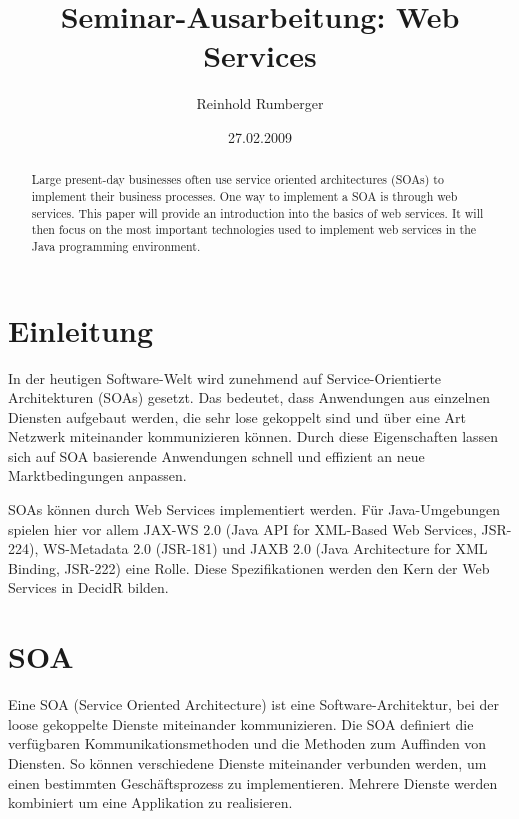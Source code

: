 \documentclass[runningheads]{llncs}
\author{Reinhold Rumberger}
\institute{Institute of Architecture of Application Systems (IAAS),\\
  University of Stuttgart\\
  \email{rumberrd@studi.informatik.uni-stuttgart.de}}
\title{Seminar-Ausarbeitung: Web Services}
\date{27.02.2009}
\newcommand{\germanquote}[1]{\glqq{}#1\grqq{}}
\newcommand{\decidr}{DecidR}
\begin{document}
  \frontmatter
  \pagestyle{headings}

  \maketitle
  \tableofcontents
  \mainmatter

  \nocite{bk_ralph}

  \label{abstract}
  \begin{otherlanguage}{english}
    \begin{abstract}
      Large present-day businesses often use service oriented architectures (SOAs) to implement
      their business processes. One way to implement a SOA is through web services. This paper will
      provide an introduction into the basics of web services. It will then focus on the most
      important technologies used to implement web services in the Java programming environment.
    \end{abstract}
  \end{otherlanguage}


  \label{intro}
  \section{Einleitung}
    In der heutigen Software-Welt wird zunehmend auf Service-Orientierte Architekturen (SOAs)
    gesetzt. Das bedeutet, dass Anwendungen aus einzelnen Diensten aufgebaut werden, die sehr lose
    gekoppelt sind und über eine Art Netzwerk miteinander kommunizieren können. Durch diese
    Eigenschaften lassen sich auf SOA basierende Anwendungen schnell und effizient an neue
    Marktbedingungen anpassen.

    SOAs können durch Web Services implementiert werden. Für Java-Um\-ge\-bung\-en spielen hier vor
    allem JAX-WS 2.0 (Java API for XML-Based Web Services, JSR-224), WS-Metadata 2.0 (JSR-181) und
    JAXB 2.0 (Java Architecture for XML Binding, JSR-222) eine Rolle. Diese Spezifikationen werden
    den Kern der Web Services in \decidr{} bilden.


  \label{soa}
  \section{SOA}
  \nocite{wk_soa}
    Eine \germanquote{SOA} (Service Oriented Architecture) ist eine Software-Architektur, bei der
    loose gekoppelte Dienste miteinander kommunizieren. Die SOA definiert die verfügbaren
    Kommunikationsmethoden und die Methoden zum Auffinden von Diensten. So können verschiedene
    Dienste miteinander verbunden werden, um einen bestimmten Geschäftsprozess zu implementieren.
    Mehrere Dienste werden kombiniert um eine Applikation zu realisieren.
\end{document}
